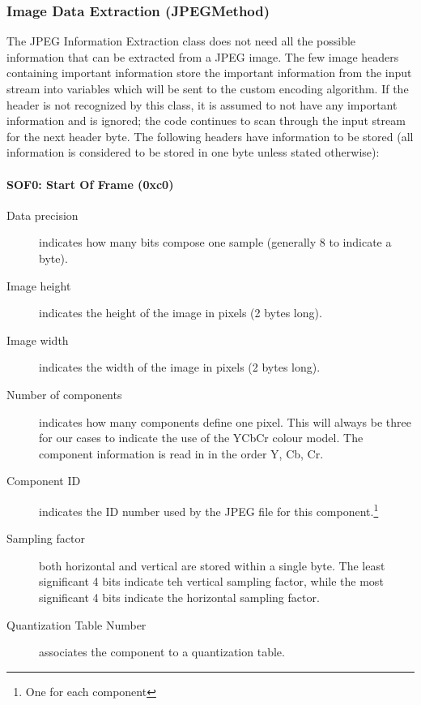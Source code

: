 \subsubsection{Image Data Extraction (JPEGMethod)}

The JPEG Information Extraction class does not need all the possible information that can be extracted from a JPEG image. 
The few image headers containing important information store the important information from 
the input stream into variables which will be sent to the custom encoding algorithm. 
If the header is not recognized by this class, it is assumed to not have any important information and is ignored; 
the code continues to scan through the input stream for the next header byte. 
The following headers have  information to be stored (all information is considered to be stored in one byte unless stated otherwise):

\paragraph*{SOF0: Start Of Frame (0xc0)}
\begin{description}
	\item[Data precision] indicates how many bits compose one sample (generally 8 to indicate a byte).
	\item[Image height] indicates the height of the image in pixels (2 bytes long).
	\item[Image width] indicates the width of the image in pixels (2 bytes long).
	\item[Number of components] indicates how many components define one pixel. 
		This will always be three for our cases to indicate the use of the YCbCr colour model. 
		The component information is read in in the order Y, Cb, Cr.
	\item[Component ID] indicates the ID number used by the JPEG file for this component.\footnote{One for each component}
	\item[Sampling factor] both horizontal and vertical are stored within a single byte. 
		The least significant 4 bits indicate teh vertical sampling factor, while 
		the most significant 4 bits indicate the horizontal sampling factor.\footnotemark[1] 
	\item[Quantization Table Number] associates the component to a quantization table.\footnotemark[1] 
\end{description}

